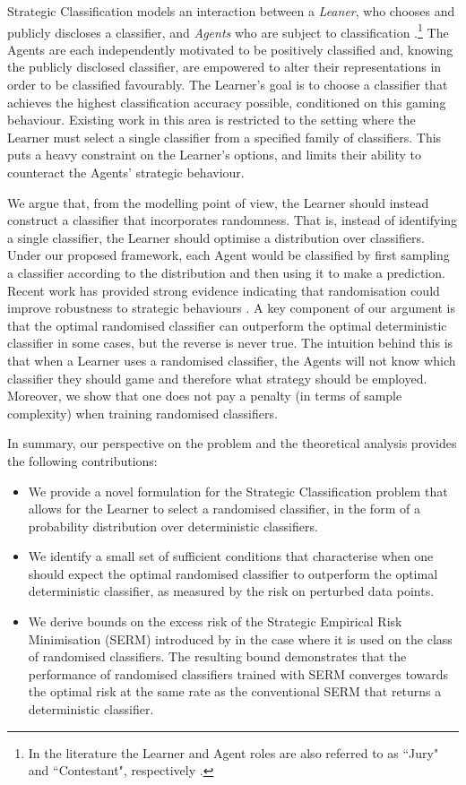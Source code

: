 Strategic Classification models an interaction between a \emph{Leaner}, who chooses and publicly discloses a classifier, and \emph{Agents} who are subject to classification \citep{hardt2016}.\footnote{In the literature the Learner and Agent roles are also referred to as ``Jury" and ``Contestant", respectively \citep{hardt2016}.} The Agents are each independently motivated to be positively classified and, knowing the publicly disclosed classifier, are empowered to alter their representations in order to be classified favourably. The Learner's goal is to choose a classifier that achieves the highest classification accuracy possible, conditioned on this gaming behaviour. Existing work in this area is restricted to the setting where the Learner must select a single classifier from a specified family of classifiers. This puts a heavy constraint on the Learner's options, and limits their ability to counteract the Agents' strategic behaviour.

We argue that, from the modelling point of view, the Learner should instead construct a classifier that incorporates randomness. That is, instead of identifying a single classifier, the Learner should optimise a distribution over classifiers. Under our proposed framework, each Agent would be classified by first sampling a classifier according to the distribution and then using it to make a prediction. Recent work has provided strong evidence indicating that randomisation could improve robustness to strategic behaviours \cite{heredia2023, pinot2020}. A key component of our argument is that the optimal randomised classifier can outperform the optimal deterministic classifier in some cases, but the reverse is never true. The intuition behind this is that when a Learner uses a randomised classifier, the Agents will not know which classifier they should game and therefore what strategy should be employed. Moreover, we show that one does not pay a penalty (in terms of sample complexity) when training randomised classifiers.

In summary, our perspective on the problem and the theoretical analysis provides the following contributions:
\begin{itemize}
    \item We provide a novel formulation for the Strategic Classification problem that allows for the Learner to select a randomised classifier, in the form of a probability distribution over deterministic classifiers.
    \item We identify a small set of sufficient conditions that characterise when one should expect the optimal randomised classifier to outperform the optimal deterministic classifier, as measured by the risk on perturbed data points.
    \item We derive bounds on the excess risk of the Strategic Empirical Risk Minimisation (SERM) introduced by \citet{levanon2021} in the case where it is used on the class of randomised classifiers. The resulting bound demonstrates that the performance of randomised classifiers trained with SERM converges towards the optimal risk at the same rate as the conventional SERM that returns a deterministic classifier.
\end{itemize}

